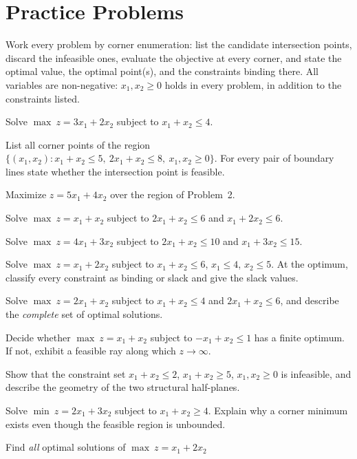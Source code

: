 \section{Practice Problems}

Work every problem by corner enumeration: list the candidate intersection
points, discard the infeasible ones, evaluate the objective at every
corner, and state the optimal value, the optimal point(s), and the
constraints binding there. All variables are non-negative:
$x_{1},x_{2}\ge 0$ holds in every problem, in addition to the constraints
listed.

\begin{problems}
  \item Solve $\max\ z=3x_{1}+2x_{2}$ subject to $x_{1}+x_{2}\le 4$.
  \item List all corner points of the region
        $\{(x_{1},x_{2}):x_{1}+x_{2}\le 5,\ 2x_{1}+x_{2}\le 8,\
        x_{1},x_{2}\ge 0\}$. For every pair of boundary lines state whether
        the intersection point is feasible.
  \item Maximize $z=5x_{1}+4x_{2}$ over the region of Problem~2.
  \item Solve $\max\ z=x_{1}+x_{2}$ subject to $2x_{1}+x_{2}\le 6$ and
        $x_{1}+2x_{2}\le 6$.
  \item Solve $\max\ z=4x_{1}+3x_{2}$ subject to $2x_{1}+x_{2}\le 10$ and
        $x_{1}+3x_{2}\le 15$.
  \item Solve $\max\ z=x_{1}+2x_{2}$ subject to $x_{1}+x_{2}\le 6$,
        $x_{1}\le 4$, $x_{2}\le 5$. At the optimum, classify every
        constraint as binding or slack and give the slack values.
  \item Solve $\max\ z=2x_{1}+x_{2}$ subject to $x_{1}+x_{2}\le 4$ and
        $2x_{1}+x_{2}\le 6$, and describe the \emph{complete} set of
        optimal solutions.
  \item Decide whether $\max\ z=x_{1}+x_{2}$ subject to $-x_{1}+x_{2}\le 1$
        has a finite optimum. If not, exhibit a feasible ray along which
        $z\to\infty$.
  \item Show that the constraint set $x_{1}+x_{2}\le 2$,
        $x_{1}+x_{2}\ge 5$, $x_{1},x_{2}\ge 0$ is infeasible, and describe
        the geometry of the two structural half-planes.
  \item Solve $\min\ z=2x_{1}+3x_{2}$ subject to $x_{1}+x_{2}\ge 4$.
        Explain why a corner minimum exists even though the feasible region
        is unbounded.
  \item Find \emph{all} optimal solutions of $\max\ z=x_{1}+2x_{2}$

\end{problems}
